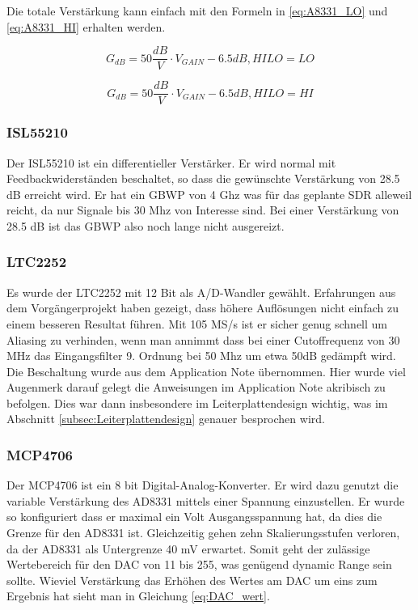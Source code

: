 Die totale Verstärkung kann einfach mit den Formeln in \ref{eq:A8331_LO} und \ref{eq:A8331_HI} erhalten werden.

\begin{equation}
    G_{dB} = 50 \frac{dB}{V} \cdot V_{GAIN} - 6.5 dB, HILO = LO
\label{eq:A8331_LO}
\end{equation}

\begin{equation}
    G_{dB} = 50 \frac{dB}{V} \cdot V_{GAIN} - 6.5 dB, HILO = HI
\label{eq:A8331_HI}
\end{equation}

\subsubsection{ISL55210}
Der ISL55210\cite{ISL55210} ist ein differentieller Verstärker. Er wird normal mit Feedbackwiderständen beschaltet, so dass die gewünschte Verstärkung von 28.5 dB erreicht wird.
Er hat ein GBWP von 4 Ghz was für das geplante SDR alleweil reicht, da nur Signale bis 30 Mhz von Interesse sind. Bei einer Verstärkung von 28.5 dB ist das GBWP also noch lange nicht ausgereizt.

\subsubsection{LTC2252}
Es wurde der LTC2252\cite{LTC2252} mit 12 Bit als A/D-Wandler gewählt. Erfahrungen aus dem Vorgängerprojekt haben gezeigt, dass höhere Auflösungen nicht einfach zu einem besseren Resultat führen. %
Mit 105 MS/s ist er sicher genug schnell um Aliasing zu verhinden, wenn man annimmt dass bei einer Cutoffrequenz von 30 MHz das Eingangsfilter 9. Ordnung bei 50 Mhz um etwa 50dB gedämpft wird.
Die Beschaltung wurde aus dem Application Note übernommen. Hier wurde viel Augenmerk darauf gelegt die Anweisungen im Application Note akribisch zu befolgen. Dies war dann insbesondere im Leiterplattendesign wichtig, was im Abschnitt \ref{subsec:Leiterplattendesign} genauer besprochen wird.

\subsubsection{MCP4706}
\label{subsec:MCP4706}
Der MCP4706\cite{MCP4706} ist ein 8 bit Digital-Analog-Konverter. Er wird dazu genutzt die variable Verstärkung des AD8331 mittels einer Spannung einzustellen. Er wurde so konfiguriert dass er maximal ein Volt Ausgangsspannung hat, da dies die Grenze für den AD8331 ist. Gleichzeitig gehen zehn Skalierungsstufen verloren, da der AD8331 als Untergrenze 40 mV erwartet. Somit geht der zulässige Wertebereich für den DAC von 11 bis 255, was genügend dynamic Range sein sollte. Wieviel Verstärkung das Erhöhen des Wertes am DAC um eins zum Ergebnis hat sieht man in Gleichung \ref{eq:DAC_wert}.

